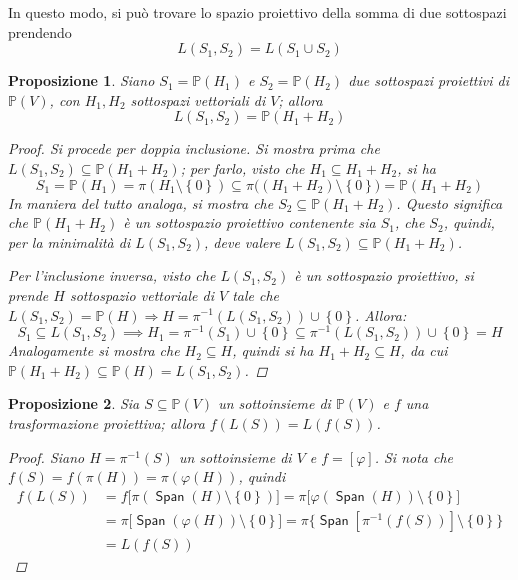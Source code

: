 \documentclass[11pt]{scrartcl}
\theoremstyle{style1}
\newtheorem{prop}{Proposizione}[section]
\numberwithin{equation}{subsection}
\renewcommand{\operatorname}[1]{\mathop{\mathrm{\textsf{#1}}}}
\begin{document}
In questo modo, si pu\`o trovare lo spazio proiettivo della somma di due sottospazi prendendo 
\begin{equation}
	L(S_1,S_2) = L(S_1\cup S_2)
\end{equation}
\begin{prop}
	Siano $S_1 = \mathbb{P}(H_1)$ e $S_2 = \mathbb{P}(H_2)$ due sottospazi proiettivi di $\mathbb{P}(V)$, con $H_1,H_2$ sottospazi vettoriali di $V$; allora
	\[
	L(S_1,S_2) = \mathbb{P}(H_1+H_2)
	\] 
	\begin{proof}
		Si procede per doppia inclusione. 
		Si mostra prima che $L(S_1,S_2) \subseteq \mathbb{P}(H_1+H_2)$; per farlo, visto che $H_1 \subseteq H_1 +H_2$, si ha
		\[
		S_1 = \mathbb{P}(H_1) = \pi(H_1\setminus\left\{ 0 \right\} ) \subseteq \pi\big((H_1+H_2) \setminus\left\{ 0 \right\} \big) = \mathbb{P}(H_1+H_2)
		\] 
		In maniera del tutto analoga, si mostra che $S_2 \subseteq \mathbb{P}(H_1+H_2)$.
		Questo significa che $\mathbb{P}(H_1+H_2)$ \`e un sottospazio proiettivo contenente sia $S_1$, che $S_2$, quindi, per la minimalit\`a di $L(S_1,S_2)$, deve valere $L(S_1,S_2) \subseteq \mathbb{P}(H_1+H_2)$.

		Per l'inclusione inversa, visto che $L(S_1,S_2)$ \`e un sottospazio proiettivo, si prende $H$ sottospazio vettoriale di $V$ tale che $L(S_1,S_2) = \mathbb{P}(H)\Rightarrow H = \pi^{-1} (L(S_1,S_2)) \cup \left\{ 0 \right\} $.
		Allora:
		\[
		S_1 \subseteq L(S_1,S_2) \implies H_1 = \pi^{-1} (S_1) \cup \left\{ 0 \right\} \subseteq \pi^{-1} (L(S_1,S_2)) \cup \left\{ 0  \right\} =H
		\] 
		Analogamente si mostra che $H_2\subseteq H$, quindi si ha $H_1+H_2 \subseteq H$, da cui $\mathbb{P}(H_1+H_2) \subseteq \mathbb{P}(H) = L(S_1,S_2)$.
	\end{proof}
\end{prop}
\begin{prop}
	Sia $S \subseteq \mathbb{P}(V)$ un sottoinsieme di $\mathbb{P}(V)$ e $f$ una trasformazione proiettiva; allora $f(L(S)) = L(f(S))$.
	\begin{proof}
		Siano $H = \pi^{-1} (S)$ un sottoinsieme di $V$ e $f = [\varphi ]$.
		Si nota che $f(S) = f(\pi(H)) = \pi(\varphi (H))$, quindi
		\[
		\begin{split}
			f(L(S)) &= f\big[\pi (\operatorname{Span} (H) \setminus \left\{ 0 \right\} )\big] = \pi\big[ \varphi (\operatorname{Span} (H)) \setminus\left\{ 0 \right\} \big]\\
				&= \pi\big[\operatorname{Span} (\varphi (H))\setminus\left\{ 0 \right\}  \big]=\pi\big\{\operatorname{Span} [\pi^{-1} (f(S))] \setminus\left\{ 0 \right\} \big\}\\
				&=L(f(S))
		\end{split}
		\] 
	\end{proof}
\end{prop}
\end{document}
